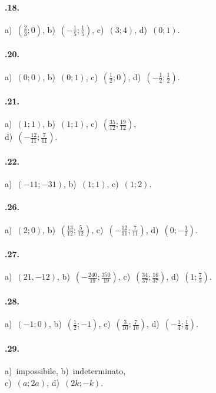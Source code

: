 \begin{multicols}{2}
\paragraph{\thechapter.18.} a)~$\left(\frac{2}{3};0\right)$, b)~$\left(-{\frac{1}{5}};\frac{1}{5}\right)$, c)~$(3;4)$, d)~$(0;1)$.

\paragraph{\thechapter.20.} a)~$(0;0)$, b)~$(0;1)$, c)~$\left(\frac{1}{2};0\right)$, d)~$\left(-{\frac{1}{2}};\frac{1}{2}\right)$.

\paragraph{\thechapter.21.} a)~$(1;1)$, b)~$(1;1)$, c)~$\left(\frac{35}{12};\frac{19}{12}\right)$, \protect\\d)~$\left(-{\frac{12}{11}};\frac{7}{11}\right)$.

\paragraph{\thechapter.22.} a)~$(-11;-31)$, b)~$(1;1)$, c)~$(1;2)$.

\paragraph{\thechapter.26.} a)~$(2;0)$, b)~$\left(\frac{13}{12};\frac{5}{12}\right)$, c)~$\left(-{\frac{12}{11}};\frac{7}{11}\right)$, d)~$\left(0;-\frac{1}{2}\right)$.

\paragraph{\thechapter.27.} a)~$(21,-12)$, b)~$\left(-{\frac{240}{19}};\frac{350}{19}\right)$, c)~$\left(\frac{34}{37};\frac{16}{37}\right)$, d)~$\left(1;\frac{7}{3}\right)$.

\paragraph{\thechapter.28.} a)~$\left(-1;0\right)$, b)~$\left(\frac{1}{2};-1\right)$, c)~$\left(\frac{3}{10};\frac{7}{10}\right)$, d)~$\left(-{\frac{1}{4}};\frac{1}{6}\right)$.

\paragraph{\thechapter.29.} a)~impossibile, b)~indeterminato, \protect\\ c)~$(a;2a)$, d)~$(2k;-k)$.


\end{multicols}
